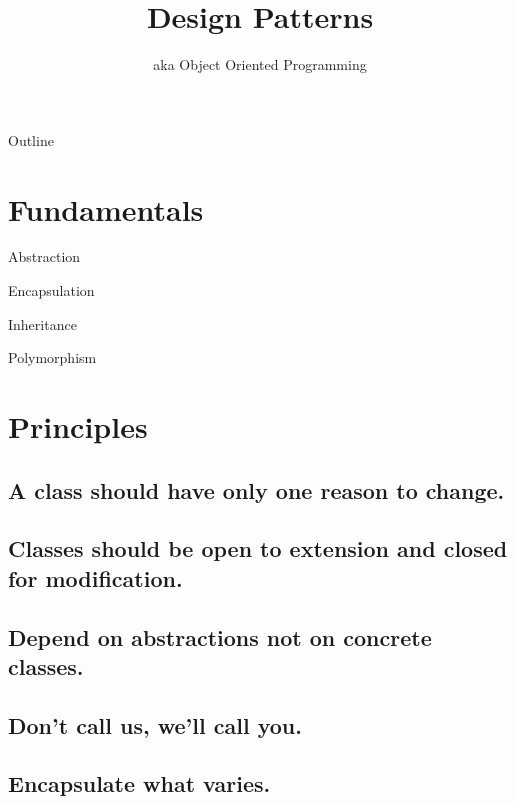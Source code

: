 \documentclass{beamer}
\title{Design Patterns}
\subtitle{aka Object Oriented Programming}
\begin{document}
\begin{frame}
  \titlepage
\end{frame}

\begin{frame}{Outline}
  \tableofcontents
\end{frame}

\section{Fundamentals}

\begin{frame}{Abstraction}
\end{frame}

\begin{frame}{Encapsulation}
\end{frame}

\begin{frame}{Inheritance}
\end{frame}

\begin{frame}{Polymorphism}
\end{frame}

\section{Principles}

\subsection{A class should have only one reason to change.}

\subsection{Classes should be open to extension and closed for modification.}

\subsection{Depend on abstractions not on concrete classes.}

\subsection{Don't call us, we'll call you.}

\subsection{Encapsulate what varies.}
\end{document}
